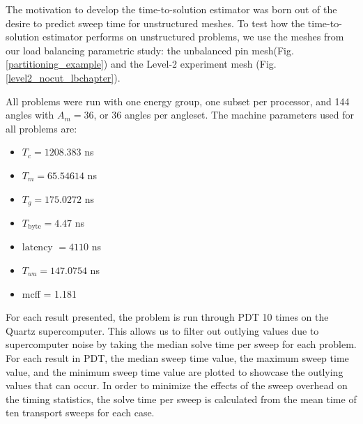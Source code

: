 The motivation to develop the time-to-solution estimator was born out of the desire to predict sweep time for unstructured meshes.
To test how the time-to-solution estimator performs on unstructured problems, we use the meshes from our load balancing parametric study: the unbalanced pin mesh(Fig. \ref{partitioning_example}) and the Level-2 experiment mesh (Fig. \ref{level2_nocut_lbchapter}).

All problems were run with one energy group, one subset per processor, and 144 angles with $A_m = 36$, or 36 angles per angleset. The machine parameters used for all problems are:
\begin{itemize}
  \item $T_c = 1208.383$ ns
  \item $T_m = 65.54614$ ns
  \item $T_g = 175.0272$ ns
  \item $T_\text{byte} = 4.47$ ns
  \item $\text{latency }= 4110$ ns
  \item $T_{wu} = 147.0754$ ns
  \item mcff = 1.181
\end{itemize}

For each result presented, the problem is run through PDT 10 times on the Quartz supercomputer.
This allows us to filter out outlying values due to supercomputer noise by taking the median solve time per sweep for each problem.
For each result in PDT, the median sweep time value, the maximum sweep time value, and the minimum sweep time value are plotted to showcase the outlying values that can occur.
In order to minimize the effects of the sweep overhead on the timing statistics, the solve time per sweep is calculated from the mean time of ten transport sweeps for each case.

